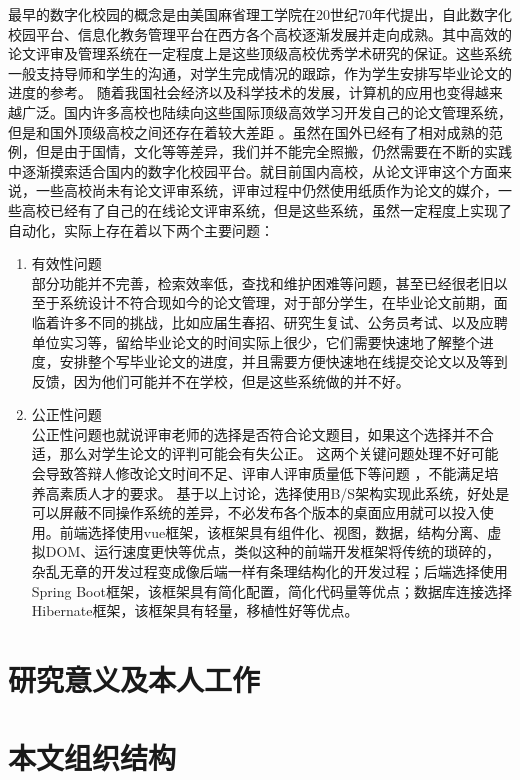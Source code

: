 最早的数字化校园的概念是由美国麻省理工学院在20世纪70年代提出，自此数字化校园平台、信息化教务管理平台在西方各个高校逐渐发展并走向成熟。其中高效的论文评审及管理系统在一定程度上是这些顶级高校优秀学术研究的保证。这些系统一般支持导师和学生的沟通，对学生完成情况的跟踪，作为学生安排写毕业论文的进度的参考。
随着我国社会经济以及科学技术的发展，计算机的应用也变得越来越广泛\cite{.2020h}。国内许多高校也陆续向这些国际顶级高效学习开发自己的论文管理系统，但是和国外顶级高校之间还存在着较大差距 \cite{.2017e}。虽然在国外已经有了相对成熟的范例，但是由于国情，文化等等差异，我们并不能完全照搬，仍然需要在不断的实践中逐渐摸索适合国内的数字化校园平台。就目前国内高校，从论文评审这个方面来说，一些高校尚未有论文评审系统，评审过程中仍然使用纸质作为论文的媒介，一些高校已经有了自己的在线论文评审系统，但是这些系统，虽然一定程度上实现了自动化，实际上存在着以下两个主要问题：
\begin{enumerate}
	\item 有效性问题\cite{.2019d}\\
	      部分功能并不完善，检索效率低，查找和维护困难等问题，甚至已经很老旧以至于系统设计不符合现如今的论文管理，对于部分学生，在毕业论文前期，面临着许多不同的挑战，比如应届生春招、研究生复试、公务员考试、以及应聘单位实习等，留给毕业论文的时间实际上很少\cite{.2019c}，它们需要快速地了解整个进度，安排整个写毕业论文的进度，并且需要方便快速地在线提交论文以及等到反馈，因为他们可能并不在学校，但是这些系统做的并不好。
	\item 公正性问题\cite{.2019d}\\
	      公正性问题也就说评审老师的选择是否符合论文题目，如果这个选择并不合适，那么对学生论文的评判可能会有失公正。
	      这两个关键问题处理不好可能会导致答辩人修改论文时间不足、评审人评审质量低下等问题 ，不能满足培养高素质人才的要求\cite{.2019d}。
	      基于以上讨论，选择使用B/S架构实现此系统，好处是可以屏蔽不同操作系统的差异，不必发布各个版本的桌面应用就可以投入使用。前端选择使用vue框架，该框架具有组件化、视图，数据，结构分离、虚拟DOM、运行速度更快等优点，类似这种的前端开发框架将传统的琐碎的，杂乱无章的开发过程变成像后端一样有条理结构化的开发过程；后端选择使用Spring Boot框架，该框架具有简化配置，简化代码量等优点；数据库连接选择Hibernate框架，该框架具有轻量，移植性好等优点。
\end{enumerate}

\section{研究意义及本人工作}

\section{本文组织结构}
